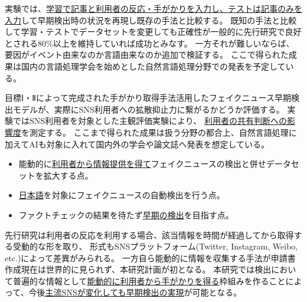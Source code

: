 実験では、\underline{学習で記事と利用者の反応・手がかりを入力し、テストは記事のみを入力}して早期検出時の状況を再現し既存の手法と比較する。
既知の手法と比較して学習・テストでデータセットを変更しても正確性が一般的に先行研究で良好とされる80\%以上を維持していれば成功とみなす。
一方それが難しいならば、要因がイベント由来なのか言語由来なのか追加で検証する。
ここで得られた成果は国内の言語処理学会を始めとした自然言語処理分野での発表を予定している。




目標Ⅰ・Ⅱによって完成された手がかり取得手法活用したフェイクニュース早期検出モデルが、実際にSNS利用者への拡散抑止力に繋がるかどうか評価する。
実験ではSNS利用者を対象とした主観評価実験により、
\underline{利用者の共有判断への影響度}を測定する。
ここまで得られた成果は扱う分野の都合上、自然言語処理に加えてAIも対象に入れて国内外の学会や論文誌へ発表を想定している。


\vspace{20pt}
\begin{itemize}
    \setlength{\parskip}{0cm}
    \setlength{\itemsep}{0cm}
    \item 能動的に\underline{利用者から情報提供を得て}フェイクニュースの検出と併せデータセットを拡大する点。
    \item \underline{日本語}を対象にフェイクニュースの自動検出を行う点。
    \item ファクトチェックの結果を待たず\underline{早期の検出}を目指す点。
\end{itemize}
\vspace{-10pt}
先行研究は利用者の反応を利用する場合、該当情報を時間が経過してから取得する受動的な形を取り、
形式もSNSプラットフォーム(Twitter, Instagram, Weibo, etc.)によって差異がみられる。
一方自ら能動的に情報を収集する手法が申請書作成現在は世界的に見られず、本研究計画が初となる。
本研究では検出において普遍的な情報として\underline{能動的に利用者から手がかりを得る}枠組みを作ることによって、今後\underline{主流SNSが変化しても早期検出の実現}が可能となる。

